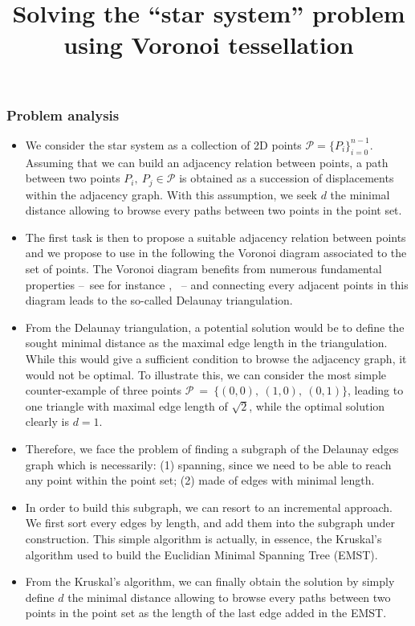 \documentclass[11pt,a4paper]{article}
\title{Solving the ``star system'' problem using Voronoi tessellation}
\author{}
\begin{document}


\subsubsection*{Problem analysis}

\begin{itemize}
\item  We consider the star system as a collection of 2D points $\mathcal{P} = \{P_i\}_{i=0}^{n-1}$. Assuming that we can build an adjacency relation between points, a path between two points $P_i,~P_j \in \mathcal{P}$ is obtained as a succession of displacements within the adjacency graph. With this assumption, we seek $d$ the minimal distance allowing to browse every paths between two points in the point set. \\
\item The first task is then to propose a suitable adjacency relation between points and we propose to use in the following the Voronoi diagram associated to the set of points. The Voronoi diagram benefits from numerous fundamental properties --~see for instance \cite{aurenhammer1991voronoi}, \cite{o1998computational}~-- and connecting every adjacent points in this diagram leads to the so-called Delaunay triangulation. \\
\item From the Delaunay triangulation, a potential solution would be to define the sought minimal distance as the maximal edge length in the triangulation. While this would give a sufficient condition to browse the adjacency graph, it would not be optimal. To illustrate this, we can consider the most simple counter-example of three points $\mathcal{P}~=~\{(0, 0),~(1, 0), ~(0, 1)\}$, leading to one triangle with maximal edge length of $\sqrt{2}$, while the optimal solution clearly is $d=1$.\\
\item Therefore, we face the problem of finding a subgraph of the Delaunay edges graph which is necessarily: (1) spanning, since we need to be able to reach any point within the point set; (2) made of edges with minimal length. \\
\item In order to build this subgraph, we can resort to an incremental approach. We first sort every edges by length, and add them into the subgraph under construction. This simple algorithm is actually, in essence, the Kruskal's algorithm \cite{kruskal1956shortest} used to build the Euclidian Minimal Spanning Tree (EMST). \\
\item From the Kruskal's algorithm, we can finally obtain the solution by simply define $d$ the minimal distance allowing to browse every paths between two points in the point set as the length of the last edge added in the EMST.
\end{itemize}
\end{document}
